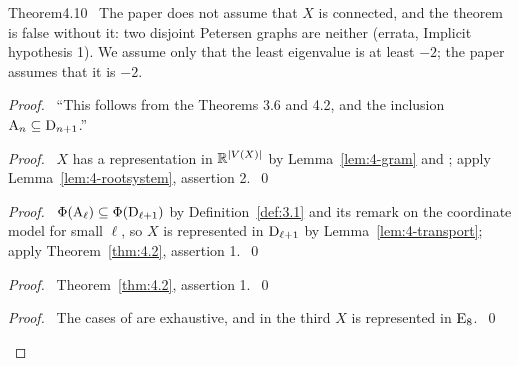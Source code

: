 \begin{cgss}{Theorem}{4.10}\label{thm:4.10}
 \repair\ The paper does not assume that $X$ is connected, and the theorem is false without it:
 two disjoint Petersen graphs are neither (errata, Implicit hypothesis 1). We assume only that
 the least eigenvalue is at least $-2$; the paper assumes that it is $-2$.
\end{cgss}
\begin{proof}
 \pfsketch\ ``This follows from the Theorems 3.6 and 4.2, and the inclusion $\mathrm{A}_n\subseteq\mathrm{D}_{n+1}$.''
 \begin{proof}\pf\ $X$ has a representation in ${\mathbb R}^{|V(X)|}$ by Lemma~\ref{lem:4-gram} and
  ; apply Lemma~\ref{lem:4-rootsystem}, assertion 2.~\qed\end{proof}
 \begin{proof}\pf\ $\Phi(\mathrm{A}_\ell)\subseteq\Phi(\mathrm{D}_{\ell+1})$ by Definition~\ref{def:3.1} and
  its remark on the coordinate model for small $\ell$, so
  $X$ is represented in $\mathrm{D}_{\ell+1}$ by Lemma~\ref{lem:4-transport}; apply
  Theorem~\ref{thm:4.2}, assertion 1.~\qed\end{proof}
 \begin{proof}\pf\ Theorem~\ref{thm:4.2}, assertion 1.~\qed\end{proof}
 \qedstep
 \begin{proof}\pf\ The cases of  are exhaustive, and in the third $X$ is
  represented in $\mathrm{E}_8$.~\qed\end{proof}
\end{proof}

